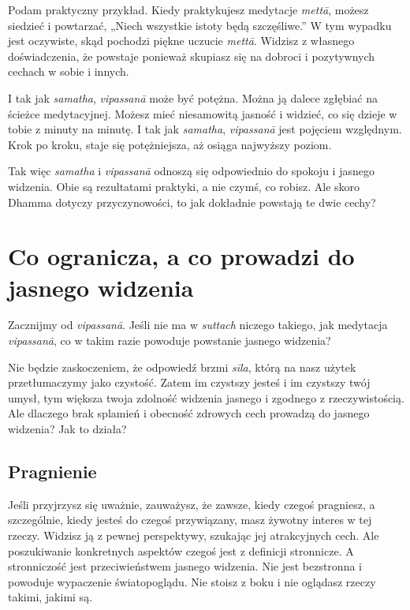 \documentclass[12pt,openany]{book}
\begin{document}
Podam praktyczny przykład. Kiedy praktykujesz medytacje \textit{mettā}, możesz siedzieć i powtarzać, „Niech wszystkie istoty będą szczęśliwe.” W tym wypadku jest oczywiste, skąd pochodzi piękne uczucie \textit{mettā}. Widzisz z własnego doświadczenia, że powstaje ponieważ skupiasz się na dobroci i pozytywnych cechach w sobie i innych.

I tak jak \textit{samatha}, \textit{vipassanā} może być potężna. Można ją dalece zgłębiać na ścieżce medytacyjnej. Możesz mieć niesamowitą jasność i widzieć, co się dzieje w tobie z minuty na minutę. I tak jak  \textit{samatha}, \textit{vipassanā} jest pojęciem względnym. Krok po kroku, staje się potężniejsza, aż osiąga najwyższy poziom.

Tak więc \textit{samatha} i \textit{vipassanā} odnoszą się odpowiednio do spokoju i jasnego widzenia. Obie są rezultatami praktyki, a nie czymś, co robisz. Ale skoro Dhamma dotyczy przyczynowości, to jak dokładnie powstają te dwie cechy?

\chapter*{Co ogranicza, a co prowadzi do jasnego widzenia}

Zacznijmy od \textit{vipassanā}. Jeśli nie ma w \textit{suttach} niczego takiego, jak medytacja  \textit{vipassanā}, co w takim razie powoduje powstanie jasnego widzenia?

Nie będzie zaskoczeniem, że odpowiedź brzmi \textit{sīla}, którą na nasz użytek przetłumaczymy jako czystość. Zatem im czystszy jesteś i im czystszy twój umysł, tym większa twoja zdolność widzenia jasnego i zgodnego z rzeczywistością. Ale dlaczego brak splamień i obecność zdrowych cech prowadzą do jasnego widzenia? Jak to działa?

\section*{Pragnienie}

Jeśli przyjrzysz się uważnie, zauważysz, że zawsze, kiedy czegoś pragniesz, a szczególnie, kiedy jesteś do czegoś przywiązany, masz żywotny interes w tej rzeczy. Widzisz ją z pewnej perspektywy, szukając jej atrakcyjnych cech. Ale poszukiwanie konkretnych aspektów czegoś jest z definicji stronnicze. A stronniczość jest przeciwieństwem jasnego widzenia. Nie jest bezstronna i powoduje wypaczenie światopoglądu. Nie stoisz z boku i nie oglądasz rzeczy takimi, jakimi są.
\end{document}
